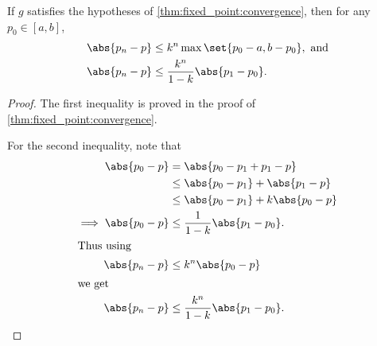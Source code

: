 \documentclass[12pt]{article}
\begin{document}
\begin{corollary} \label{thm:fixed_point:bound}
    If $g$ satisfies the hypotheses of \cref{thm:fixed_point:convergence},
    then for any $p_0 \in [a, b]$, \begin{align*}
        \abs{p_n - p} &\leq k^n \max\set{p_0 - a, b - p_0}, \text{ and} \\
        \abs{p_n - p} &\leq \frac{k^n}{1 - k} \abs{p_1 - p_0}.
    \end{align*}
\end{corollary}
\begin{proof}
    The first inequality is proved in the proof of
    \cref{thm:fixed_point:convergence}.

    For the second inequality, note that \begin{align*}
        \abs{p_0 - p} &= \abs{p_0 - p_1 + p_1 - p} \\
                 &\leq \abs{p_0 - p_1} + \abs{p_1 - p} \\
                 &\leq \abs{p_0 - p_1} + k \abs{p_0 - p} \\
        \implies \abs{p_0 - p} &\leq \frac{1}{1 - k} \abs{p_1 - p_0}. \\
        \shortintertext{Thus using}
        \abs{p_n - p} &\leq k^n \abs{p_0 - p} \\
        \shortintertext{we get}
        \abs{p_n - p} &\leq \frac{k^n}{1 - k} \abs{p_1 - p_0}. \qedhere
    \end{align*}
\end{proof}
\end{document}
